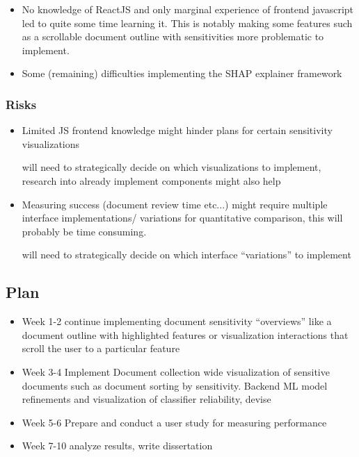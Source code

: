 \documentclass[11pt,a4paper,british]{article}
\begin{document}
\begin{itemize}
    \item No knowledge of ReactJS and only marginal experience of frontend javascript led to quite some time learning it. This is notably making some features such as a scrollable document outline with sensitivities more problematic to implement.
    \item Some (remaining) difficulties implementing the SHAP explainer framework
\end{itemize}

\subsubsection{Risks}\label{risks}

\begin{itemize}
    \item Limited JS frontend knowledge might hinder plans for certain sensitivity visualizations
    
    will need to strategically decide on which visualizations to implement, research into already implement components might also help

    \item Measuring success (document review time etc...) might require multiple interface implementations/ variations for quantitative comparison, this will probably be time consuming.
    
    will need to strategically decide on which interface ``variations'' to implement

\end{itemize}

\subsection{Plan}\label{plan}

\begin{itemize}
    \item Week 1-2 continue implementing document sensitivity ``overviews'' like a document outline with highlighted features or visualization interactions that scroll the user to a particular feature
    \item Week 3-4 Implement Document collection wide visualization of sensitive documents such as document sorting by sensitivity. Backend ML model refinements and visualization of classifier reliability, devise 
    \item Week 5-6 Prepare and conduct a user study for measuring performance
    \item Week 7-10 analyze results, write dissertation
\end{itemize}
\end{document}

